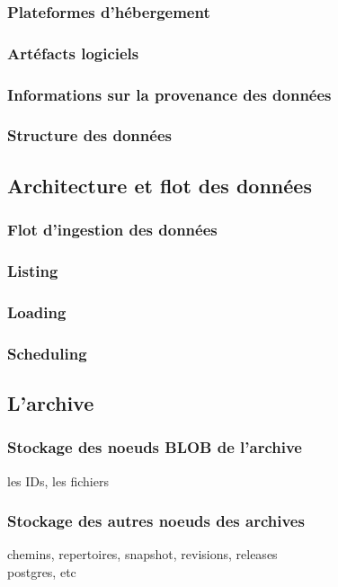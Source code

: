 \documentclass[12pt,a4paper]{report}
\begin{document}
\subsubsection{Plateformes d'hébergement}

\subsubsection{Artéfacts logiciels}

\subsubsection{Informations sur la provenance des données}

\subsubsection{Structure des données}

\subsection{Architecture et flot des données}
\subsubsection{Flot d'ingestion des données}

\subsubsection{Listing}

\subsubsection{Loading}

\subsubsection{Scheduling}

\subsection{L'archive}
\subsubsection{Stockage des noeuds BLOB de l'archive}
les IDs, les fichiers


\subsubsection{Stockage des autres noeuds des archives}
chemins, repertoires, snapshot, revisions, releases\\
postgres, etc
\end{document}
